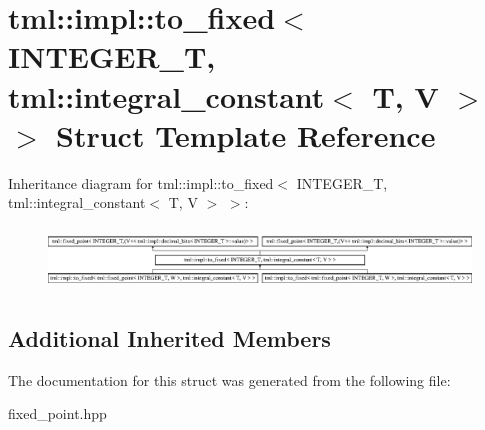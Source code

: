 \hypertarget{structtml_1_1impl_1_1to__fixed_3_01INTEGER__T_00_01tml_1_1integral__constant_3_01T_00_01V_01_4_01_4}{\section{tml\+:\+:impl\+:\+:to\+\_\+fixed$<$ I\+N\+T\+E\+G\+E\+R\+\_\+\+T, tml\+:\+:integral\+\_\+constant$<$ T, V $>$ $>$ Struct Template Reference}
\label{structtml_1_1impl_1_1to__fixed_3_01INTEGER__T_00_01tml_1_1integral__constant_3_01T_00_01V_01_4_01_4}
}
Inheritance diagram for tml\+:\+:impl\+:\+:to\+\_\+fixed$<$ I\+N\+T\+E\+G\+E\+R\+\_\+\+T, tml\+:\+:integral\+\_\+constant$<$ T, V $>$ $>$\+:\begin{figure}[H]
\begin{center}
\leavevmode
\includegraphics[height=1.666667cm]{structtml_1_1impl_1_1to__fixed_3_01INTEGER__T_00_01tml_1_1integral__constant_3_01T_00_01V_01_4_01_4}
\end{center}
\end{figure}
\subsection*{Additional Inherited Members}


The documentation for this struct was generated from the following file\+:\begin{DoxyCompactItemize}
\item 
fixed\+\_\+point.\+hpp\end{DoxyCompactItemize}
